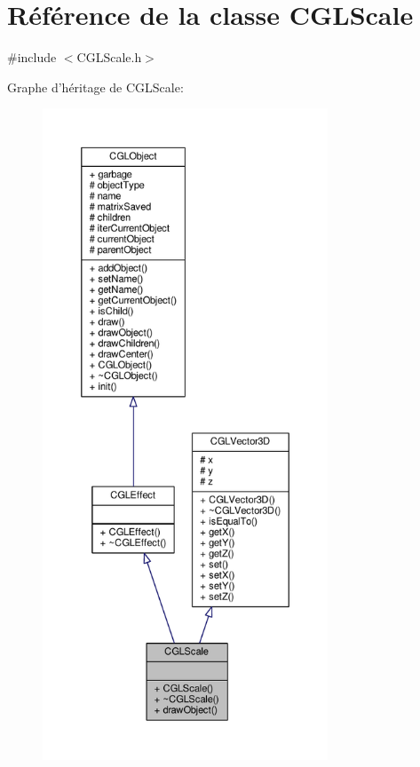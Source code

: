 \hypertarget{class_c_g_l_scale}{\section{Référence de la classe C\-G\-L\-Scale}
\label{class_c_g_l_scale}
}


{\ttfamily \#include $<$C\-G\-L\-Scale.\-h$>$}



Graphe d'héritage de C\-G\-L\-Scale\-:\nopagebreak
\begin{figure}[H]
\begin{center}
\leavevmode
\includegraphics[height=550pt]{d9/d69/class_c_g_l_scale__inherit__graph}
\end{center}
\end{figure}


